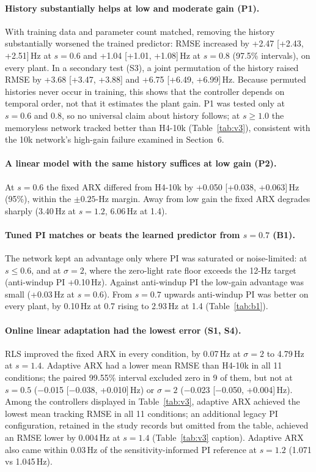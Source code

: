 \documentclass[11pt]{article}
\newcommand{\Hz}{\,Hz}
\begin{document}
\paragraph{History substantially helps at low and moderate gain (P1).} With training data and parameter count matched, removing the history substantially worsened the trained predictor: RMSE increased by +2.47 [+2.43, +2.51]\Hz{} at $s=0.6$ and +1.04 [+1.01, +1.08]\Hz{} at $s=0.8$ (97.5\% intervals), on every plant. In a secondary test (S3), a joint permutation of the history raised RMSE by +3.68 [+3.47, +3.88] and +6.75 [+6.49, +6.99]\Hz{}. Because permuted histories never occur in training, this shows that the controller depends on temporal order, not that it estimates the plant gain. P1 was tested only at $s=0.6$ and $0.8$, so no universal claim about history follows; at $s\ge1.0$ the memoryless network tracked better than H4-10k (Table~\ref{tab:v3}), consistent with the 10k network's high-gain failure examined in Section~6.

\paragraph{A linear model with the same history suffices at low gain (P2).} At $s=0.6$ the fixed ARX differed from H4-10k by +0.050 [+0.038, +0.063]\Hz{} (95\%), within the $\pm0.25$-Hz margin. Away from low gain the fixed ARX degrades sharply (3.40\Hz{} at $s=1.2$, 6.06\Hz{} at 1.4).

\paragraph{Tuned PI matches or beats the learned predictor from $s=0.7$ (B1).} The network kept an advantage only where PI was saturated or noise-limited: at $s\le0.6$, and at $\sigma=2$, where the zero-light rate floor exceeds the 12-Hz target (anti-windup PI +0.10\Hz). Against anti-windup PI the low-gain advantage was small (+0.03\Hz{} at $s=0.6$). From $s=0.7$ upwards anti-windup PI was better on every plant, by 0.10\Hz{} at 0.7 rising to 2.93\Hz{} at 1.4 (Table~\ref{tab:b1}).

\paragraph{Online linear adaptation had the lowest error (S1, S4).} RLS improved the fixed ARX in every condition, by 0.07\Hz{} at $\sigma=2$ to 4.79\Hz{} at $s=1.4$. Adaptive ARX had a lower mean RMSE than H4-10k in all 11 conditions; the paired 99.55\% interval excluded zero in 9 of them, but not at $s=0.5$ ($-$0.015 [$-$0.038, +0.010]\Hz) or $\sigma=2$ ($-$0.023 [$-$0.050, +0.004]\Hz). Among the controllers displayed in Table~\ref{tab:v3}, adaptive ARX achieved the lowest mean tracking RMSE in all 11 conditions; an additional legacy PI configuration, retained in the study records but omitted from the table, achieved an RMSE lower by 0.004\Hz{} at $s=1.4$ (Table~\ref{tab:v3} caption). Adaptive ARX also came within 0.03\Hz{} of the sensitivity-informed PI reference at $s=1.2$ (1.071 vs 1.045\Hz).
\end{document}
